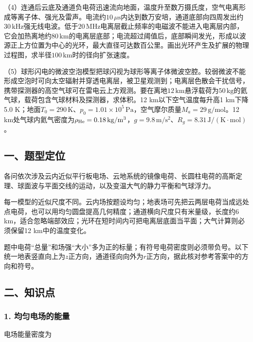 \documentclass[12pt,a4paper,fontset=fandol]{ctexart}
\begin{document}
（4）连通后云底及通道负电荷迅速流向地面，温度升至数万摄氏度，空气电离形成等离子体、强光及雷声。电流约\(10\,\mu\mathrm s\)内达到数万安培，通道底部向四周发出约\(30\,\mathrm{kHz}\)强无线电波。低于\(20\,\mathrm{MHz}\)电离层截止频率的电磁波不能进入电离层内部，它会加热离地约\(80\,\mathrm{km}\)的电离层底部；电流超过阈值后，底部瞬间发光，形成以波源正上方位置为中心的光环，最大直径可达数百公里。画出光环产生及扩展的物理过程图，求半径\(100\,\mathrm{km}\)时的径向扩张速度。

（5）球形闪电的微波空泡模型把球闪视为球形等离子体微波空腔。较弱微波不能形成空泡时可向太空辐射并穿透电离层，被卫星观测到；电离层色散会干扰信号，携带探测器的高空气球可在雷电云上方观测。要在离地\(12\,\mathrm{km}\)悬浮载荷为\(50\,\mathrm{kg}\)的氦气球，载荷包含气球材料及探测器，求体积。12
km以下空气温度每升高1 km下降5.0
K；地面\(T_0=290\,\mathrm K\)、\(p_0=1.01\times10^5\,\mathrm{Pa}\)，空气摩尔质量\(M_a=29\,\mathrm{g/mol}\)。12
km处气球内氦气密度为\(\rho_{\rm He}=0.18\,\mathrm{kg/m^3}\)，\(g=9.8\,\mathrm{m/s^2}\)、\(R_g=8.31\,\mathrm{J/(K\cdot mol)}\)。

\subsection{一、题型定位}\label{ux4e00ux9898ux578bux5b9aux4f4d-6}

各问依次涉及云内近似平行板电场、云地系统的镜像电荷、长圆柱电荷的高斯定理、球面波与平面交线的运动，以及变温大气的静力平衡和气球浮力。

每一模型的近似尺度不同。云内场按题设均匀；地表场可先把云两层电荷当成远处点电荷，也可以用均匀圆盘提高几何精度；通道横向尺度只有米量级，长度约6
km，适合忽略端部效应；光环在短时间内可把电离层底面当平面；大气计算则必须保留12
km中的温度变化。

题中电荷``总量''和场强``大小''多为正的标量；有符号电荷密度则必须带负号。以下统一地表竖直向上为\(z\)正方向，通道径向向外为\(r\)正方向，据此核对参考答案中的方向和符号。

\subsection{二、知识点}\label{ux4e8cux77e5ux8bc6ux70b9-6}

\subsubsection{1.
均匀电场的能量}\label{ux5747ux5300ux7535ux573aux7684ux80fdux91cf}

电场能量密度为
\end{document}
